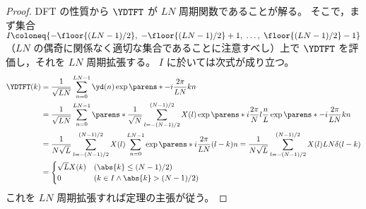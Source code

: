             \begin{proof}
                \quad\par
                DFT の性質から $\YDTFT$ が $LN$ 周期関数であることが解る。
                そこで，まず集合 $I\coloneq\{-\floor{(LN-1)/2},\;-\floor{(LN-1)/2}+1,\;\dots,\;\floor{(LN-1)/2}-1\}$ （$LN$ の偶奇に関係なく適切な集合であることに注意すべし）上で $\YDTFT$ を評価し，それを $LN$ 周期拡張する。
                $I$ に於いては次式が成り立つ。
                \begin{align*}
                    \YDTFT(k) &= \frac{1}{\sqrt{LN}}\sum_{n=0}^{LN-1}\yd(n)\exp\parens*{-i\frac{2\pi}{LN}kn} \\
                    &= \frac{1}{\sqrt{LN}}\sum_{n=0}^{LN-1}\parens*{\frac{1}{\sqrt{N}}\sum_{l=-(N-1)/2}^{(N-1)/2}X(l)\exp\parens*{i\frac{2\pi}{N}l\frac{n}{L}}}\exp\parens*{-i\frac{2\pi}{LN}kn} \\
                    &= \frac{1}{N\sqrt{L}}\sum_{l=-(N-1)/2}^{(N-1)/2}X(l)\sum_{n=0}^{LN-1}\exp\parens*{i\frac{2\pi}{LN}(l-k)n} = \frac{1}{N\sqrt{L}}\sum_{l=-(N-1)/2}^{(N-1)/2}X(l)LN\delta(l-k) \\
                    &= \begin{cases}
                        \sqrt{L}X(k) & (\abs{k}\leq (N-1)/2) \\
                        0 & (k\in I\land\abs{k}>(N-1)/2)
                    \end{cases}
                \end{align*}
                これを $LN$ 周期拡張すれば定理の主張が従う。
            \end{proof}
